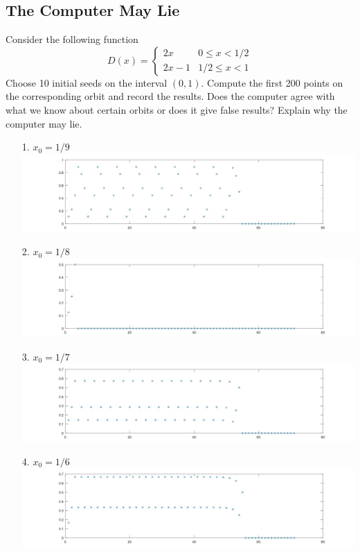\documentclass{article}
\begin{document}
\subsection*{The Computer May Lie}
Consider the following function
\[
	D(x) = \begin{cases}
		2x & 0\leq x < 1/2 \\
		2x -1 & 1/2 \leq x < 1
	\end{cases} 
\]
Choose 10 initial seeds on the interval $(0,1)$. Compute the first 200 points on the corresponding orbit and record the results. Does the computer agree with what we know about certain orbits or does it give false results? Explain why the computer may lie. 
\begin{itemize}
	\item[1.] $x_0 = 1/9$ \\
		\includegraphics[scale = 0.2]{Fig1.3.6.1.jpg}
	\item[2.] $x_0 = 1/8$ \\
		\includegraphics[scale = 0.2]{Fig1.3.6.2.jpg}
	\item[3.] $x_0 = 1/7$ \\
		\includegraphics[scale = 0.2]{Fig1.3.6.3.jpg}
	\item[4.] $x_0 = 1/6$ \\
		\includegraphics[scale = 0.2]{Fig1.3.6.4.jpg}

\end{itemize}
\end{document}
